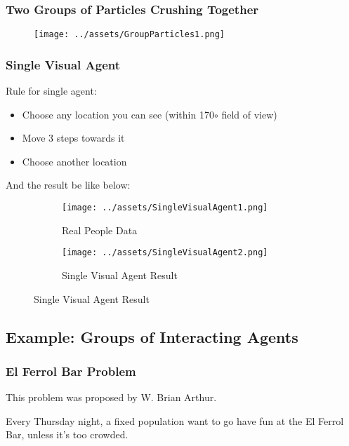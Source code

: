 \documentclass[a4paper, openany]{book}
\begin{document}
\subsubsection{Two Groups of Particles Crushing Together}

\begin{figure}[htbp]
  \centering
  \texttt{[image: ../assets/GroupParticles1.png]}
\end{figure}

\subsubsection{Single Visual Agent}\label{sec:SingleVisualAgent}

Rule for single agent:

\begin{itemize}
  \item Choose any location you can see (within 170$\circ$ field of view)
  \item Move 3 steps towards it
  \item Choose another location
\end{itemize}

And the result be like below:

\begin{figure}[htbp]
  \centering
  \begin{subfigure}{0.49\textwidth}
    \centering
    \texttt{[image: ../assets/SingleVisualAgent1.png]}
    \caption{Real People Data}
  \end{subfigure}
  \begin{subfigure}{0.49\textwidth}
    \centering
    \texttt{[image: ../assets/SingleVisualAgent2.png]}
    \caption{Single Visual Agent Result}
  \end{subfigure}
\end{figure}

\subsection{Example: Groups of Interacting Agents}

\subsubsection{El Ferrol Bar Problem}

This problem was proposed by W. Brian Arthur.

Every Thursday night, a fixed population want to go have fun at the El Ferrol Bar, unless it's too crowded.
\end{document}
